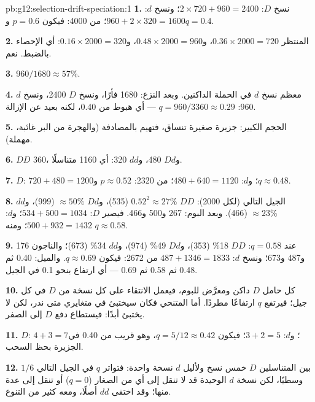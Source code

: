 \begin{solution}{pb:g12:selection-drift-speciation:1}
\textbf{1.} نسخ $D$: $2 \times 720 + 960 = 2400$؛ ونسخ $d$: $960 +
2 \times 320 = 1600$؛ من 4000: فيكون $p = 0.6$ و$q = 0.4$.

\textbf{2.} المنتظر $0.36 \times 2000 = 720$، و$0.48 \times 2000 =
960$، و$0.16 \times 2000 = 320$: أي الإحصاء بالضبط. نعم.

\textbf{3.} $960/1680 \approx 57\%$.

\textbf{4.} معظم نسخ $d$ في الحملة الداكنين. وبعد النزع: 1680 فأرًا،
ونسخ $D$ 2400، ونسخ $d$ 960: $q = 960/3360 \approx
0.29$ --- أي هبوط من 0.40، لكنه بعيد عن الإزالة.

\textbf{5.} الحجم الكبير:  جزيرة صغيرة تنساق، فتهيم 
بالمصادفة (والهجرة من البر غائبة،  مهملة).

\textbf{6.} $DD$ 360، و$Dd$ 480، و$dd$ 320: أي 1160 متناسلًا.

\textbf{7.} $D$: $720 + 480 = 1200$؛ و$d$: $480 + 640 = 1120$؛ من
2320: $p \approx 0.52$ و$q \approx 0.48$.

\textbf{8.} الجيل التالي (لكل 2000): $DD$ $0.52^2 \approx 27\%$
(535)، و$Dd$ $\approx 50\%$ (999)، و$dd$ $\approx 23\%$ (466). وبعد
البوم: 267 و500 و466. فيصير $D$: $534 + 500 = 1034$؛ و$d$: $500 + 932 =
1432$؛ ومنه $q \approx 0.58$.

\textbf{9.} عند $q = 0.58$: $DD$ 18\% (353)، و$Dd$ 49\% (974)، و$dd$
34\% (673)؛ والناجون 176 و487 و673؛ ونسخ $d$: $487 + 1346 = 1833$ من
2672: فيكون $q \approx 0.69$. والميل: 0.40 ثم 0.48 ثم 0.58 ثم 0.69 ---
أي ارتفاع بنحو 0.1 في الجيل.

\textbf{10.} كل حامل  $D$ داكن ومعرَّض للبوم، فيعمل الانتقاء على
كل نسخة من $D$ في كل جيل؛ فيرتفع $q$ ارتفاعًا مطردًا. أما 
المتنحي فكان سيختبئ في متغايري  متى ندر، لكن  لا يختبئ
أبدًا: فيستطاع دفع $D$ إلى الصفر.

\textbf{11.} $D$: $4 + 3 = 7$؛ و$d$: $3 + 2 = 5$؛ فيكون $q = 5/12 \approx
0.42$، وهو قريب من 0.40 في الجزيرة بحظ السحب.

\textbf{12.} بين المتناسلين  $D$ خمس نسخ ولأليل $d$ نسخة واحدة:
فتواتر $q$ في الجيل التالي $1/6$ وسطيًا، لكن نسخة $d$ الوحيدة قد لا
تنقل إلى أي من الصغار ($q = 0$) أو تنقل إلى عدة منها؛ وقد اختفى  $dd$ أصلًا، ومعه كثير من التنوع.


\end{solution}
